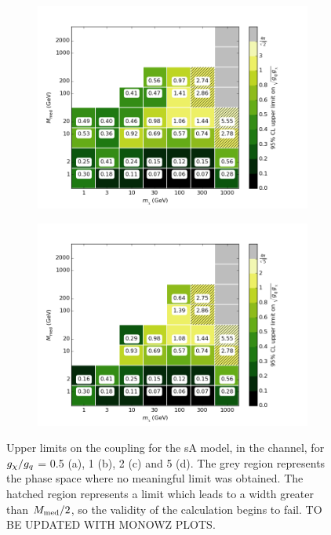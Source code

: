 \begin{figure}[h]
\begin{subfigure}[t]{0.45\textwidth}
      \includegraphics[width=1.\textwidth]{figures/grid_allpoints_SAD_rat2.png}
      \caption{}
    \end{subfigure}
    \begin{subfigure}[t]{0.45\textwidth}
      \centering
      \includegraphics[width=1.\textwidth]{figures/grid_allpoints_SAD_rat5.png}
      \caption{}
    \end{subfigure}
    \caption{Upper limits on the coupling for the sA model, in the \monoWZ channel, for $g_{\chi} / g_q$ = 0.5 (a), 1 (b), 2 (c) and 5 (d). The grey region represents the phase space where no meaningful limit was obtained. The hatched region represents a limit which leads to a width greater than $M_{\mathrm{med}} / 2$, so the validity of the calculation begins to fail. TO BE UPDATED WITH MONOWZ PLOTS.}
    \label{fig:MonoWZ_SAD_couplinglimit}
\end{figure}

